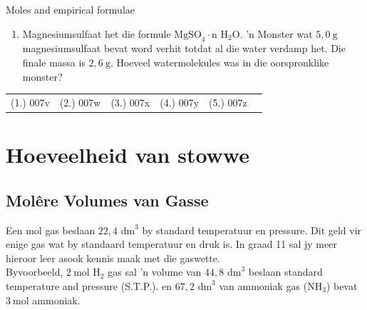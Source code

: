 \begin{exercises}{Moles and empirical formulae}
\begin{enumerate}[noitemsep, label=\textbf{\arabic*}. ]
\item Magnesiumsulfaat het die formule $\text{MgSO}_{4} \cdot \text{n H}_{2}\text{O}$. 'n Monster wat $5,0 ~\text{g}$ magnesiumsulfaat bevat word verhit totdat al die water verdamp het. Die finale massa is $2,6~\text{g}$. Hoeveel watermolekules was in die oorspronklike monster? 
\end{enumerate}
\practiceinfo
\par 
 \par \begin{tabular}[h]{cccccc}
 (1.) 007v  &  (2.) 007w  &  (3.) 007x  &  (4.) 007y  & (5.) 007z \end{tabular}
\end{exercises}
\section{Hoeveelheid van stowwe}
            \subsection*{Mol\^{e}re Volumes van Gasse}
            \nopagebreak
            \par
            \label{m38712*eip-id1168064596799}
  {Een mol gas beslaan $22,4{\text{ dm}}^{3}$ by standard temperatuur en pressure. } 
Dit geld vir enige gas wat by standaard temperatuur en druk is. In graad 11 sal jy meer hieroor leer asook kennis maak met die gaswette.\\
Byvoorbeeld, $2~\text{mol}$ $\text{H}_2$ gas sal 'n volume van $44,8{\text{ dm}}^{3}$ beslaan standard temperature and pressure (S.T.P.). en $67,2{\text{ dm}}^{3}$ van ammoniak gas ($\text{NH}_3$) bevat $3~\text{mol}$ ammoniak.
    \label{m38712*cid8}
